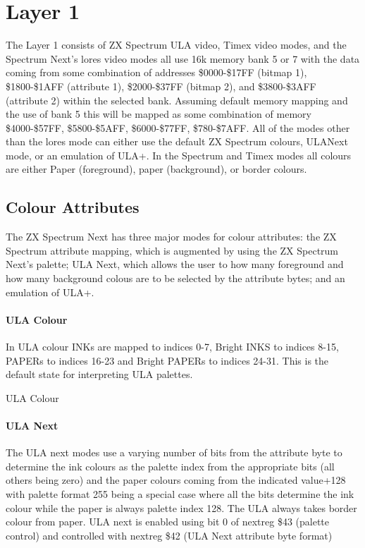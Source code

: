 \section{Layer 1}
The Layer 1 consists of ZX Spectrum ULA video, Timex video modes, and
the Spectrum Next’s lores video modes all use 16k memory bank 5 or 7
with the data coming from some combination of addresses \$0000-\$17FF
(bitmap 1), \$1800-\$1AFF (attribute 1), \$2000-\$37FF (bitmap 2), and
\$3800-\$3AFF (attribute 2) within the selected bank.  Assuming
default memory mapping and the use of bank 5 this will be mapped as
some combination of memory \$4000-\$57FF, \$5800-\$5AFF,
\$6000-\$77FF, \$780-\$7AFF. All of the modes other than the lores
mode can either use the default ZX Spectrum colours, ULANext mode, or
an emulation of ULA+. In the Spectrum and Timex modes all colours are
either Paper (foreground), paper (background), or border colours.

\subsection{Colour Attributes}
The ZX Spectrum Next has three major modes for colour attributes: the
ZX Spectrum attribute mapping, which is augmented by using the ZX
Spectrum Next's palette; ULA Next, which allows the user to how many
foreground and how many background colous are to be selected by the
attribute bytes; and an emulation of ULA+.

\paragraph{ULA Colour}
In ULA colour INKs are mapped to indices 0-7, Bright INKS to indices
8-15, PAPERs to indices 16-23 and Bright PAPERs to indices 24-31. This
is the default state for interpreting ULA palettes.

\begin{table}[h]\centering
  \caption{ULA Colour}
\end{table}

\paragraph{ULA Next}
The ULA next modes use a varying number of bits from the attribute
byte to determine the ink colours as the palette index from the
appropriate bits (all others being zero) and the paper colours coming
from the indicated value+128 with palette format 255 being a special
case where all the bits determine the ink colour while the paper is
always palette index 128. The ULA always takes border colour from
paper. ULA next is enabled using bit 0 of nextreg \$43 (palette
control) and controlled with nextreg \$42 (ULA Next attribute byte
format)

